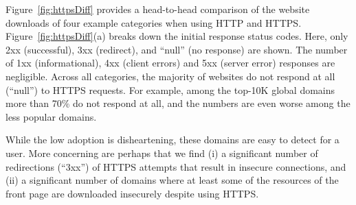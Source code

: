 \documentclass[letterpaper]{sig-alternate-10pt}
\begin{document}
Figure~\ref{fig:httpsDiff} provides a 
head-to-head comparison of the 
website downloads of four example categories when using HTTP and HTTPS.
Figure~\ref{fig:httpsDiff}(a) breaks down the initial response status codes.
Here, only 2xx (successful), 3xx (redirect), and ``null'' (no response)
are shown.  The number of 1xx (informational), 4xx (client errors) and 5xx (server error) responses are negligible. 
Across all categories,
the majority of websites do not respond at all (``null'') to HTTPS requests.
For example, among the top-10K global domains more than 70\% do not respond at all,
and the numbers are even worse among the less popular domains.

While the low adoption is disheartening,
these domains are easy to detect for a user.
More concerning 
are perhaps that we find
(i) a significant number of redirections (``3xx'') of HTTPS attempts that result in insecure connections, and 
(ii) a significant number of domains where at least some of the resources of the front page are downloaded insecurely
despite using HTTPS.
\end{document}
